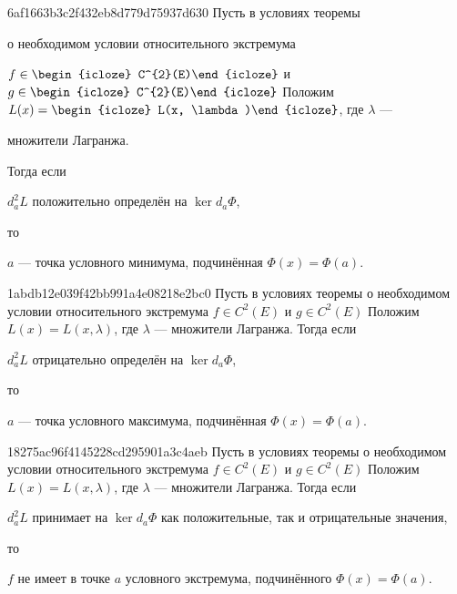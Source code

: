\begin{note}{6af1663b3c2f432eb8d779d75937d630}
    Пусть в условиях теоремы \begin{icloze}{6}о необходимом условии относительного экстремума\end{icloze} \({ f \in \begin{icloze}{5}C^{2}(E)\end{icloze} }\) и \({ g \in \begin{icloze}{5}C^{2}(E)\end{icloze} }\)
    Положим \({ L(x) = \begin{icloze}{4}L(x, \lambda)\end{icloze} }\), где \({ \lambda }\) --- \begin{icloze}{3}множители Лагранжа.\end{icloze}
    Тогда если \begin{icloze}{1}\({ d_{a}^2L }\) положительно определён на \({ \ker d_{a}\Phi }\),\end{icloze} то \begin{icloze}{2}\({ a }\) --- точка условного минимума, подчинённая \({ \Phi(x) = \Phi(a) }\).\end{icloze}
\end{note}

\begin{note}{1abdb12e039f42bb991a4e08218e2bc0}
    Пусть в условиях теоремы о необходимом условии относительного экстремума \({ f \in C^{2}(E) }\) и \({ g \in C^{2}(E) }\)
    Положим \({ L(x) = L(x, \lambda) }\), где \({ \lambda }\) --- множители Лагранжа.
    Тогда если \begin{icloze}{1}\({ d_{a}^2L }\) отрицательно определён на \({ \ker d_{a}\Phi }\),\end{icloze} то \begin{icloze}{2}\({ a }\) --- точка условного максимума, подчинённая \({ \Phi(x) = \Phi(a) }\).\end{icloze}
\end{note}

\begin{note}{18275ac96f4145228cd295901a3c4aeb}
    Пусть в условиях теоремы о необходимом условии относительного экстремума \({ f \in C^{2}(E) }\) и \({ g \in C^{2}(E) }\)
    Положим \({ L(x) = L(x, \lambda) }\), где \({ \lambda }\) --- множители Лагранжа.
    Тогда если \begin{icloze}{1}\({ d_{a}^2 L }\) принимает на \({ \ker d_{a}\Phi }\) как положительные, так и отрицательные значения,\end{icloze} то \begin{icloze}{2}\({ f }\) не имеет в точке \({ a }\) условного экстремума, подчинённого \({ \Phi(x) = \Phi(a) }\).\end{icloze}
\end{note}

